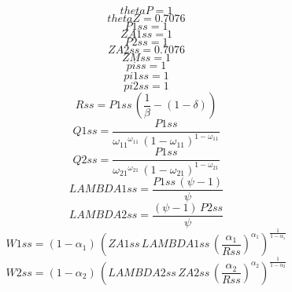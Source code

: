 \begin{dmath*}
thetaP = 1
\end{dmath*}
\begin{dmath*}
thetaZ = 0.7076
\end{dmath*}
\begin{dmath*}
P1ss = 1
\end{dmath*}
\begin{dmath*}
ZA1ss = 1
\end{dmath*}
\begin{dmath*}
P2ss = 1
\end{dmath*}
\begin{dmath*}
ZA2ss = 0.7076
\end{dmath*}
\begin{dmath*}
ZMss = 1
\end{dmath*}
\begin{dmath*}
piss = 1
\end{dmath*}
\begin{dmath*}
pi1ss = 1
\end{dmath*}
\begin{dmath*}
pi2ss = 1
\end{dmath*}
\begin{dmath*}
Rss = {P1ss}\, \left(\frac{1}{{{\beta}}}-\left(1-{{\delta}}\right)\right)
\end{dmath*}
\begin{dmath*}
Q1ss = \frac{{P1ss}}{{{\omega_{11}}}^{{{\omega_{11}}}}\, \left(1-{{\omega_{11}}}\right)^{1-{{\omega_{11}}}}}
\end{dmath*}
\begin{dmath*}
Q2ss = \frac{{P1ss}}{{{\omega_{21}}}^{{{\omega_{21}}}}\, \left(1-{{\omega_{21}}}\right)^{1-{{\omega_{21}}}}}
\end{dmath*}
\begin{dmath*}
LAMBDA1ss = \frac{{P1ss}\, \left({{\psi}}-1\right)}{{{\psi}}}
\end{dmath*}
\begin{dmath*}
LAMBDA2ss = \frac{\left({{\psi}}-1\right)\, {P2ss}}{{{\psi}}}
\end{dmath*}
\begin{dmath*}
W1ss = \left(1-{{\alpha_{1}}}\right)\, \left({ZA1ss}\, {LAMBDA1ss}\, \left(\frac{{{\alpha_{1}}}}{{Rss}}\right)^{{{\alpha_{1}}}}\right)^{\frac{1}{1-{{\alpha_{1}}}}}
\end{dmath*}
\begin{dmath*}
W2ss = \left(1-{{\alpha_{2}}}\right)\, \left({LAMBDA2ss}\, {ZA2ss}\, \left(\frac{{{\alpha_{2}}}}{{Rss}}\right)^{{{\alpha_{2}}}}\right)^{\frac{1}{1-{{\alpha_{2}}}}}
\end{dmath*}
